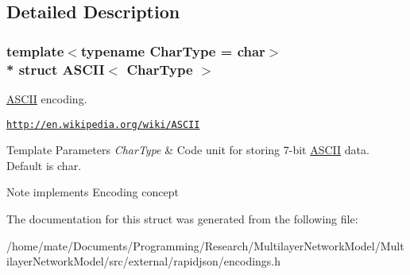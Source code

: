 \subsection{Detailed Description}
\subsubsection*{template$<$typename Char\+Type = char$>$\\*
struct A\+S\+C\+I\+I$<$ Char\+Type $>$}

\hyperlink{structASCII}{A\+S\+C\+II} encoding. 

\href{http://en.wikipedia.org/wiki/ASCII}{\tt http\+://en.\+wikipedia.\+org/wiki/\+A\+S\+C\+II} 
\begin{DoxyTemplParams}{Template Parameters}
{\em Char\+Type} & Code unit for storing 7-\/bit \hyperlink{structASCII}{A\+S\+C\+II} data. Default is char. \\
\hline
\end{DoxyTemplParams}
\begin{DoxyNote}{Note}
implements Encoding concept 
\end{DoxyNote}


The documentation for this struct was generated from the following file\+:\begin{DoxyCompactItemize}
\item 
/home/mate/\+Documents/\+Programming/\+Research/\+Multilayer\+Network\+Model/\+Multilayer\+Network\+Model/src/external/rapidjson/encodings.\+h\end{DoxyCompactItemize}
